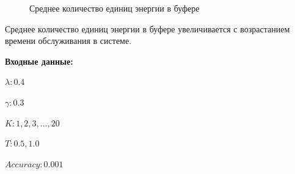 \documentclass[12pt, a4paper]{article}
\begin{document}
\begin{figure}[h]
	\caption{Среднее количество единиц энергии в буфере}
	\label{ris3}
\end{figure}

Среднее количество единиц энергии в буфере увеличивается с возрастанием времени обслуживания в системе. 
\pagebreak

\textbf{Входные данные:}

$\lambda: 0.4$

$\gamma: 0.3$

$K: 1, 2, 3, \ldots, 20$

$T: 0.5, 1.0$

$Accuracy: 0.001$
\end{document}
